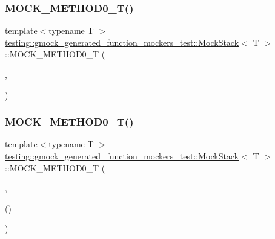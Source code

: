 \subsubsection{\texorpdfstring{M\+O\+C\+K\+\_\+\+M\+E\+T\+H\+O\+D0\+\_\+\+T()}{MOCK\_METHOD0\_T()}\hspace{0.1cm}{\footnotesize\ttfamily [1/2]}}
{\footnotesize\ttfamily template$<$typename T $>$ \\
\hyperlink{classtesting_1_1gmock__generated__function__mockers__test_1_1_mock_stack}{testing\+::gmock\+\_\+generated\+\_\+function\+\_\+mockers\+\_\+test\+::\+Mock\+Stack}$<$ T $>$\+::M\+O\+C\+K\+\_\+\+M\+E\+T\+H\+O\+D0\+\_\+T (\begin{DoxyParamCaption}\item[{\hyperlink{classtesting_1_1gmock__generated__function__mockers__test_1_1_stack_interface_a1a6646d1d9febe90c607b9b3e4539b67}{Pop}}]{,  }\item[{void()}]{ }\end{DoxyParamCaption})}

\mbox{\label{classtesting_1_1gmock__generated__function__mockers__test_1_1_mock_stack_a4b67d1f5b795e7c072fb846217a8f130}} 
\subsubsection{\texorpdfstring{M\+O\+C\+K\+\_\+\+M\+E\+T\+H\+O\+D0\+\_\+\+T()}{MOCK\_METHOD0\_T()}\hspace{0.1cm}{\footnotesize\ttfamily [2/2]}}
{\footnotesize\ttfamily template$<$typename T $>$ \\
\hyperlink{classtesting_1_1gmock__generated__function__mockers__test_1_1_mock_stack}{testing\+::gmock\+\_\+generated\+\_\+function\+\_\+mockers\+\_\+test\+::\+Mock\+Stack}$<$ T $>$\+::M\+O\+C\+K\+\_\+\+M\+E\+T\+H\+O\+D0\+\_\+T (\begin{DoxyParamCaption}\item[{Return\+Type\+With\+Comma}]{,  }\item[{std\+::map$<$ int, int $>$}]{() }\end{DoxyParamCaption})}

